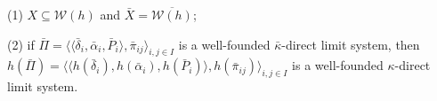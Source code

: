 (1) $X \subseteq \mathcal{W}(h)$ and $\bar{X} = \overline{\mathcal{W}(h)}$;

(2) if $\bar{\Pi} = \langle \langle \bar{\delta}_i, \bar{\alpha}_i, \bar{P}_i \rangle, \bar{\pi}_{ij} \rangle_{i,j \in I}$ is a well-founded $\bar{\kappa}$-direct limit system, then $h(\bar{\Pi}) = \langle \langle h(\bar{\delta}_i), h(\bar{\alpha}_i), h(\bar{P}_i) \rangle, h(\bar{\pi}_{ij}) \rangle_{i,j \in I}$ is a well-founded $\kappa$-direct limit system.
